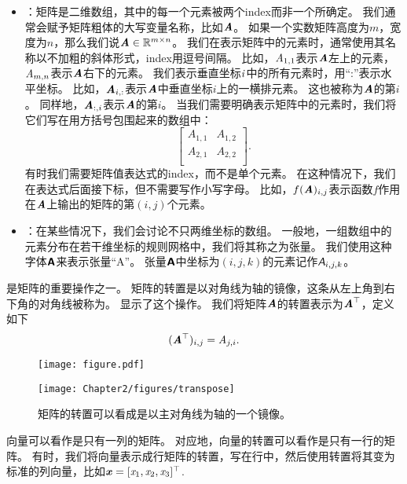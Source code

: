 \begin{itemize}
    \item {}：矩阵是二维数组，其中的每一个元素被两个\gls{index}而非一个所确定。
    我们通常会赋予矩阵粗体的大写变量名称，比如$\boldsymbol{\mathit{A}}$。
    如果一个实数矩阵高度为$m$，宽度为$n$，那么我们说$\boldsymbol{\mathit{A}}\in \mathbb{R}^{m\times n}$。
    我们在表示矩阵中的元素时，通常使用其名称以不加粗的斜体形式，\gls{index}用逗号间隔。
    比如，$\mathit{A}_{1,1}$表示$\boldsymbol{\mathit{A}}$左上的元素，$\mathit{A}_{m,n}$表示$\boldsymbol{\mathit{A}}$右下的元素。
    我们表示垂直坐标$\mathit{i}$中的所有元素时，用``:''表示水平坐标。
    比如，$\boldsymbol{\mathit{A}}_{i,:}$表示$\boldsymbol{\mathit{A}}$中垂直坐标$i$上的一横排元素。
    这也被称为$\boldsymbol{\mathit{A}}$的第$i$。
    同样地，$\boldsymbol{\mathit{A}}_{:,i}$表示$\boldsymbol{\mathit{A}}$的第$i$。
    当我们需要明确表示矩阵中的元素时，我们将它们写在用方括号包围起来的数组中：
    \begin{equation}
        \begin{bmatrix}
            A_{1,1} & A_{1,2} \\
            A_{2,1} & A_{2,2} \\
        \end{bmatrix}.
    \end{equation}
    有时我们需要矩阵值表达式的\gls{index}，而不是单个元素。
    在这种情况下，我们在表达式后面接下标，但不需要写作小写字母。
    比如，$f(\boldsymbol{\mathit{A}})_{i,j}$表示函数$f$作用在$\boldsymbol{\mathit{A}}$上输出的矩阵的第$(i,j)$个元素。


    \item {}：在某些情况下，我们会讨论不只两维坐标的数组。
    一般地，一组数组中的元素分布在若干维坐标的规则网格中，我们将其称之为张量。
    我们使用这种字体$\textsf{\textbf{A}}$来表示张量``A''。
    张量$\textsf{\textbf{A}}$中坐标为$(i,j,k)$的元素记作$\textit{\textsf{A}}_{i,j,k}$。
\end{itemize}


是矩阵的重要操作之一。
矩阵的转置是以对角线为轴的镜像，这条从左上角到右下角的对角线被称为。
显示了这个操作。
我们将矩阵$\boldsymbol{\mathit{A}}$的转置表示为$\boldsymbol{\mathit{A}}^\top$，定义如下
\begin{equation}
(\boldsymbol{\mathit{A}}^\top)_{i,j}= \mathit{A}_{j,i}.
\end{equation}

\begin{figure}[!htb]
\ifOpenSource
\centerline{\texttt{[image: figure.pdf]}}
\else
\centerline{\texttt{[image: Chapter2/figures/transpose]}}
\fi
\caption{矩阵的转置可以看成是以主对角线为轴的一个镜像。}
\label{fig:chap2_transpose}
\end{figure}

向量可以看作是只有一列的矩阵。
对应地，向量的转置可以看作是只有一行的矩阵。
有时，我们将向量表示成行矩阵的转置，写在行中，然后使用转置将其变为标准的列向量，比如$\boldsymbol{\mathit{x}}=[\mathit{x}_1, \mathit{x}_2, \mathit{x}_3]^\top$.


